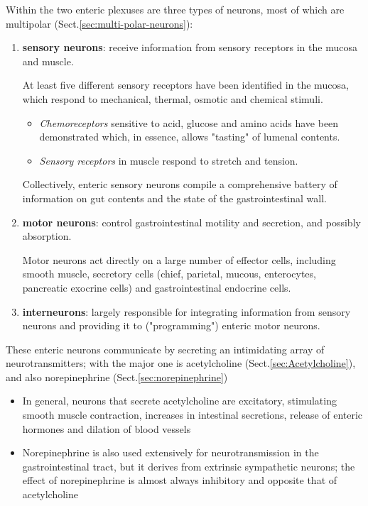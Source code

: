 Within the two enteric plexuses are three types of neurons, most of which are
multipolar (Sect.\ref{sec:multi-polar-neurons}):
\begin{enumerate}
  \item  {\bf sensory neurons}:  receive information from sensory receptors in
  the mucosa and muscle.
  
  At least five different sensory receptors have been identified in the mucosa,
  which respond to mechanical, thermal, osmotic and chemical stimuli.
  \begin{itemize}
    \item   {\it Chemoreceptors} sensitive to acid, glucose and amino acids have
    been demonstrated which, in essence, allows "tasting" of lumenal contents.
    
    \item {\it Sensory receptors} in muscle respond to stretch and tension.
    
  \end{itemize}
  Collectively, enteric sensory neurons compile a comprehensive battery of
  information on gut contents and the state of the gastrointestinal wall.
  
  \item {\bf motor neurons}:
   control gastrointestinal motility and secretion, and possibly absorption.
  
  Motor neurons act directly on a large number of effector cells, including
  smooth muscle, secretory cells (chief, parietal, mucous, enterocytes,
  pancreatic exocrine cells) and gastrointestinal endocrine cells. 

  \item {\bf interneurons}:  largely responsible for integrating information
  from sensory neurons and providing it to ("programming") enteric motor neurons.

\end{enumerate}

These enteric neurons communicate by secreting an intimidating array of
neurotransmitters; with the major one is acetylcholine
(Sect.\ref{sec:Acetylcholine}), and also norepinephrine (Sect.\ref{sec:norepinephrine})
\begin{itemize}
  \item   In general, neurons that secrete acetylcholine are excitatory,
  stimulating smooth muscle contraction, increases in intestinal secretions,
  release of enteric hormones and dilation of blood vessels  
  
  \item Norepinephrine is also used extensively for neurotransmission in the
  gastrointestinal tract, but it derives from extrinsic sympathetic neurons; the
  effect of norepinephrine is almost always inhibitory and opposite that of
  acetylcholine  
\end{itemize}

